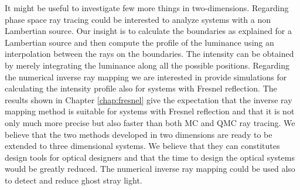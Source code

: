 It might be useful to investigate few more things in two-dimensions. Regarding phase space ray tracing could be interested to analyze systems with a non Lambertian source. Our insight is to calculate the boundaries as explained for a Lambertian source and then compute the profile of the luminance using an interpolation between the rays on the boundaries. The intensity can be obtained by merely integrating the luminance along all the possible positions. Regarding the numerical inverse ray mapping we are interested in provide simulations for calculating the intensity profile also for systems with Fresnel reflection. The results shown in Chapter \ref{chap:fresnel} give the expectation that the inverse ray mapping method is suitable for systems with Fresnel reflection and that it is not only much more precise but also faster than both MC and QMC ray tracing. We believe that the two methods developed in two dimensions are ready to be extended to three dimensional systems. We believe that they can constitutes design tools for optical designers and that the time to design the optical systems would be greatly reduced. The numerical inverse ray mapping could be used also to detect and reduce ghost stray light.